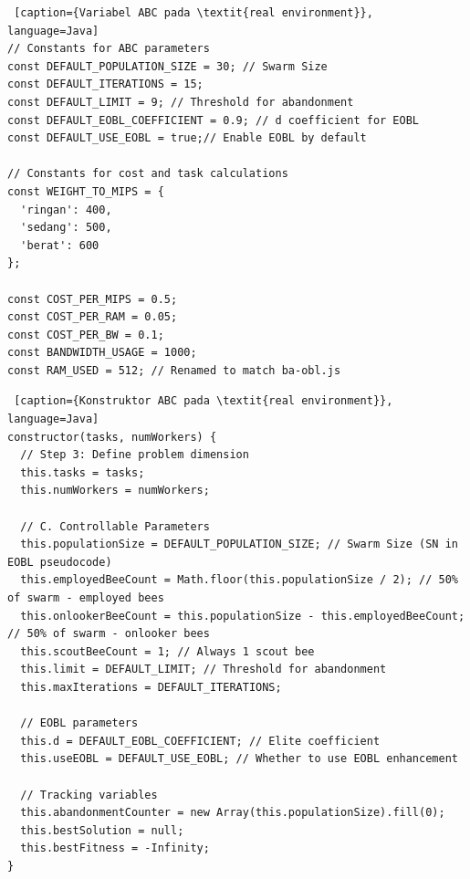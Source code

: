 \begin{lstlisting} [caption={Variabel ABC pada \textit{real environment}}, language=Java]
// Constants for ABC parameters
const DEFAULT_POPULATION_SIZE = 30; // Swarm Size
const DEFAULT_ITERATIONS = 15;
const DEFAULT_LIMIT = 9; // Threshold for abandonment
const DEFAULT_EOBL_COEFFICIENT = 0.9; // d coefficient for EOBL
const DEFAULT_USE_EOBL = true;// Enable EOBL by default

// Constants for cost and task calculations
const WEIGHT_TO_MIPS = {
  'ringan': 400,
  'sedang': 500,
  'berat': 600
};

const COST_PER_MIPS = 0.5;
const COST_PER_RAM = 0.05;
const COST_PER_BW = 0.1;
const BANDWIDTH_USAGE = 1000;
const RAM_USED = 512; // Renamed to match ba-obl.js
\end{lstlisting}

\begin{lstlisting} [caption={Konstruktor ABC pada \textit{real environment}}, language=Java]
constructor(tasks, numWorkers) {
  // Step 3: Define problem dimension
  this.tasks = tasks;
  this.numWorkers = numWorkers;
  
  // C. Controllable Parameters
  this.populationSize = DEFAULT_POPULATION_SIZE; // Swarm Size (SN in EOBL pseudocode)
  this.employedBeeCount = Math.floor(this.populationSize / 2); // 50% of swarm - employed bees
  this.onlookerBeeCount = this.populationSize - this.employedBeeCount; // 50% of swarm - onlooker bees
  this.scoutBeeCount = 1; // Always 1 scout bee
  this.limit = DEFAULT_LIMIT; // Threshold for abandonment
  this.maxIterations = DEFAULT_ITERATIONS;
  
  // EOBL parameters
  this.d = DEFAULT_EOBL_COEFFICIENT; // Elite coefficient
  this.useEOBL = DEFAULT_USE_EOBL; // Whether to use EOBL enhancement
  
  // Tracking variables
  this.abandonmentCounter = new Array(this.populationSize).fill(0);
  this.bestSolution = null;
  this.bestFitness = -Infinity;
}
\end{lstlisting}


